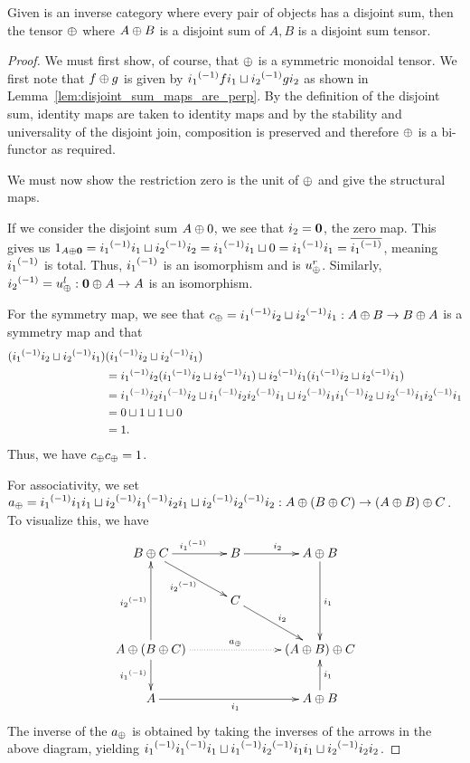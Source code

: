 \begin{proposition}\label{prop:enough_disjoint_sums_make_a_disjoint_sum_tensor}
  Given \X is an inverse category where every pair of objects has a disjoint sum, then the tensor
  $\oplus$ where $A\oplus B$ is a disjoint sum of $A,B$ is a disjoint sum tensor.
\end{proposition}
\begin{proof}
  We must first show, of course, that $\oplus$ is a symmetric monoidal tensor. We first note that $f\oplus g$ is
  given by   ${i_1}^{(-1)} f i_1 \sqcup {i_2}^{(-1)} g i_2$ as shown in
  Lemma~\ref{lem:disjoint_sum_maps_are_perp}. By the definition of the disjoint sum, identity maps
  are taken to identity maps and by the stability and universality of the disjoint join, composition
  is preserved and therefore $\oplus$ is a bi-functor as required.

  We must now show the restriction zero is the unit of $\oplus$ and give the structural maps.

  If we consider the disjoint sum $A\oplus0$, we see that $i_2 = \mathbf{0}$, the zero map. This gives us
  $1_{A\oplus\mathbf{0}}  = {i_1}^{(-1)}i_1 \sqcup {i_2}^{(-1)}i_2 = {i_1}^{(-1)}i_1 \sqcup 0 = {i_1}^{(-1)}i_1 =
    \overline{{i_1}^{(-1)}}$, meaning ${i_1}^{(-1)}$ is total. Thus, ${i_1}^{(-1)}$ is an isomorphism and is
  $u_{\oplus}^r$. Similarly, ${i_2}^{(-1)} = u_{\oplus}^l:\mathbf{0}\oplus A \to A$ is an isomorphism.

  For the symmetry map, we see that $c_\oplus = {i_1}^{(-1)}i_2 \sqcup {i_2}^{(-1)}i_1: A\oplus B \to B\oplus A$ is a symmetry
  map and that
  \begin{align*}
    ({i_1}^{(-1)}i_2 \sqcup {i_2}^{(-1)}i_1)&({i_1}^{(-1)}i_2 \sqcup {i_2}^{(-1)}i_1)\\
    &={i_1}^{(-1)}i_2({i_1}^{(-1)}i_2
    \sqcup {i_2}^{(-1)}i_1) \sqcup {i_2}^{(-1)}i_1({i_1}^{(-1)}i_2 \sqcup {i_2}^{(-1)}i_1)\\
    &={i_1}^{(-1)}i_2{i_1}^{(-1)}i_2 \sqcup {i_1}^{(-1)}i_2{i_2}^{(-1)}i_1 \sqcup {i_2}^{(-1)}i_1{i_1}^{(-1)}i_2
    \sqcup {i_2}^{(-1)}i_1{i_2}^{(-1)}i_1\\
    & = 0 \sqcup 1 \sqcup 1 \sqcup 0 \\
    & = 1.
  \end{align*}
  Thus, we have $c_\oplus c_\oplus =1$.

  For associativity, we set $a_\oplus = {i_1}^{(-1)}i_1i_1 \sqcup {i_2}^{(-1)}{i_1}^{(-1)}i_2i_1 \sqcup {i_2}^{(-1)}
  {i_2}^{(-1)} i_2:A\oplus(B\oplus C) \to (A\oplus B)\oplus C$.
  To visualize this, we have
  \[
    \xymatrix@C+5pt{
      B\+C \ar[r]^{\inv{i_1}} \ar[dr]_{\inv{i_2}}
        & B \ar[r]^{i_2}
        & A\+B \ar[dd]^{i_1}\\
      & C \ar[dr]^{i_2} & \\
      A\+(B\+C)\ar[uu]^{\inv{i_2}} \ar[d]_{\inv{i_1}} \ar@{.>}[rr]^{a_{\+}} && (A\+B)\+C \\
      A \ar[rr]_{i_1} & & A\+B \ar[u]_{i_1}
    }
  \]
  The inverse of the $a_\oplus$ is obtained by taking the inverses of the arrows in the above diagram,
  yielding ${i_1}^{(-1)}{i_1}^{(-1)}i_1 \sqcup {i_1}^{(-1)}{i_2}^{(-1)}i_1i_1 \sqcup {i_2}^{(-1)}i_2 i_2$.


\end{proof}
